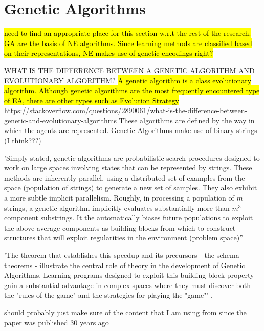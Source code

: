 \section{Genetic Algorithms}

\hl{need to find an appropriate place for this section w.r.t the rest of the research. GA are the basis of NE algorithms. Since learning methods are classified based on their representations, NE makes use of genetic encodings right?}

WHAT IS THE DIFFERENCE BETWEEN A GENETIC ALGORITHM AND EVOLUTIONARY ALGORITHM?
\hl{A genetic algorithm is a class evolutionary algorithm. Although genetic algorithms are the most frequently encountered type of EA, there are other types such as Evolution Strategy}
https://stackoverflow.com/questions/2890061/what-is-the-difference-between-genetic-and-evolutionary-algorithms
These algorithms are defined by the way in which the agents are represented. Genetic Algorithms make use of binary strings (I think???)



'Simply stated, genetic algorithms are probabilistic search procedures designed to work on large spaces involving states that can be represented by strings. These methods are inherently parallel, using a distributed set of examples from the space (population of strings) to generate a new set of samples. They also exhibit a more subtle implicit parallelism. Roughly, in processing a population of $m$ strings, a genetic algorithm implicitly evaluates substantially more than $m^3$ component substrings. It the automatically biases future populations to exploit the above average components as building blocks from which to construct structures that will exploit regularities in the environment (problem space)'' \cite{goldberg1988genetic}

'The theorem that establishes this speedup and its precursors - the schema theorems - illustrate the central role of theory in the development of Genetic Algorithms. Learning programs designed to exploit this building block property gain a substantial advantage in complex spaces where they must discover both the "rules of the game" and the strategies for playing the "game"' \cite{goldberg1988genetic}.

should probably just make sure of the content that I am using from \cite{goldberg1988genetic} since the paper was published 30 years ago

